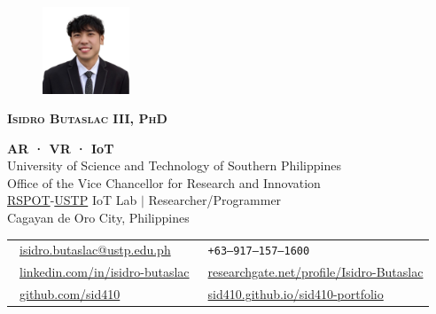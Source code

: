 \documentclass[letterpaper,11pt]{article}
\begin{document}
\begin{figure}
	\vspace{-6pt}
	\hfill\includegraphics[width=0.23\textwidth]{images/my-pic.png}
\end{figure}

{\LARGE \scshape \textbf{Isidro Butaslac III, PhD}} \\

\begin{adjustwidth}{0.3cm}{0cm}

	{\textbf{AR · VR · IoT}} \\
	{University of Science and Technology of Southern Philippines} \\
	{Office of the Vice Chancellor for Research and Innovation} \\
	{\href{https://www.rspotsolutions.com/}{RSPOT}-\href{https://www.ustp.edu.ph/}{USTP} IoT Lab $|$ Researcher/Programmer} \\
	{Cagayan de Oro City, Philippines} \\

	\vspace{3pt}

	\begin{tabular}{@{} l l}
		{\faEnvelope\ \footnotesize\href{mailto:isidro.butaslac@ustp.edu.ph}{isidro.butaslac@ustp.edu.ph} }               &
		{\faPhone\ \footnotesize\texttt{+63--917--157--1600}}                                                                                                         \\

		{\faLinkedin\ \footnotesize\href{https://www.linkedin.com/in/isidro-butaslac/}{linkedin.com/in/isidro-butaslac} } &
		{\resizebox{4mm}{!}{{\faResearchgate}}\ \footnotesize\href{https://www.researchgate.net/profile/Isidro-Butaslac/}{researchgate.net/profile/Isidro-Butaslac} } \\

		{\faGithub\ \footnotesize\href{https://github.com/sid410}{github.com/sid410} }                                    &
		{\faBriefcase\ \footnotesize\href{https://sid410.github.io/sid410-portfolio/}{sid410.github.io/sid410-portfolio} }                                            \\
	\end{tabular}

\end{adjustwidth}
\end{document}
